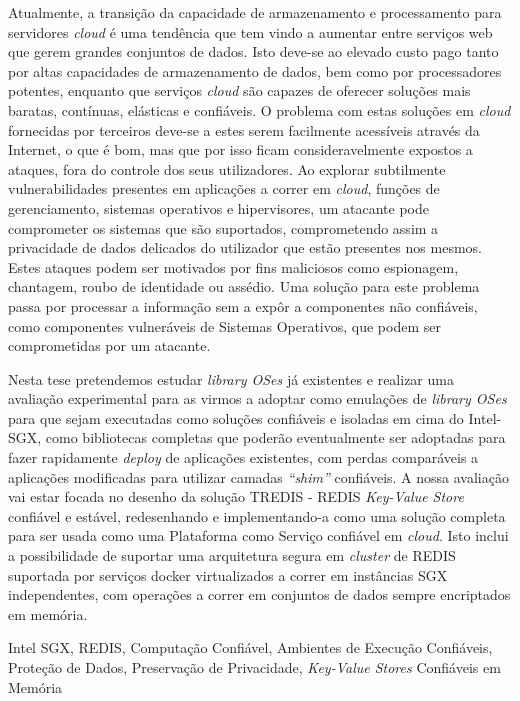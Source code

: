 Atualmente, a transição da capacidade de armazenamento e processamento para servidores \textit{cloud} é uma tendência que tem vindo a aumentar entre serviços web que gerem grandes conjuntos de dados. Isto deve-se ao elevado custo pago tanto por altas capacidades de armazenamento de dados, bem como por processadores potentes, enquanto que serviços \textit{cloud} são capazes de oferecer soluções mais baratas, contínuas, elásticas e confiáveis.
O problema com estas soluções em \textit{cloud} fornecidas por terceiros deve-se a estes serem facilmente acessíveis através da Internet, o que é bom, mas que por isso ficam consideravelmente expostos a ataques, fora do controle dos seus utilizadores. Ao explorar subtilmente vulnerabilidades presentes em aplicações a correr em \textit{cloud}, funções de gerenciamento, sistemas operativos e hipervisores, um atacante pode comprometer os sistemas que são suportados, comprometendo assim a privacidade de dados delicados do utilizador que estão presentes nos mesmos.
Estes ataques podem ser motivados por fins maliciosos como espionagem, chantagem, roubo de identidade ou assédio. Uma solução para este problema passa por processar a informação sem a expôr a componentes não confiáveis, como componentes vulneráveis de Sistemas Operativos, que podem ser comprometidas por um atacante.

Nesta tese pretendemos estudar \textit{library OSes} já existentes e realizar uma avaliação experimental para as virmos a adoptar como emulações de \textit{library OSes} para que sejam executadas como soluções confiáveis e isoladas em cima do Intel-SGX, como bibliotecas completas que poderão eventualmente ser adoptadas para fazer rapidamente \textit{deploy} de aplicações existentes, com perdas comparáveis a aplicações modificadas para utilizar camadas \textit{“shim”} confiáveis.
A nossa avaliação vai estar focada no desenho da solução TREDIS - REDIS  \textit{Key-Value Store} confiável e estável, redesenhando e implementando-a como uma solução completa para ser usada como uma Plataforma como Serviço confiável em \textit{cloud}. Isto inclui a possibilidade de suportar uma arquitetura segura em \textit{cluster} de REDIS suportada por serviços docker virtualizados a correr em instâncias SGX independentes, com operações a correr em conjuntos de dados sempre encriptados em memória. 
	
\begin{keywords}
 Intel SGX, REDIS, Computação Confiável, Ambientes de Execução Confiáveis, Proteção de Dados, Preservação de Privacidade, \textit{Key-Value Stores} Confiáveis em Memória
\end{keywords}


	

